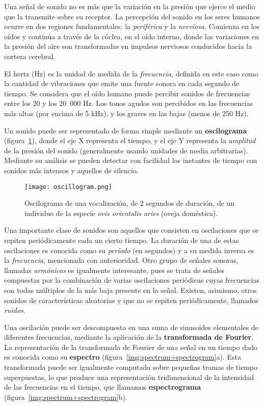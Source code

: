 Una señal de sonido no es más que la variación en la presión que ejerce el medio que la transmite sobre su receptor.
La percepción del sonido en los seres humanos ocurre en dos regiones fundamentales: la \textit{periférica} y la \textit{nerviosa}.
Comienza en los oídos y continúa a través de la cóclea, en el oído interno, donde las variaciones en la presión del aire son transformadas en impulsos nerviosos conducidos hacia la corteza cerebral.

El hertz (Hz) es la unidad de medida de la \textit{frecuencia}, definida en este caso como la cantidad de vibraciones que emite una fuente sonora en cada segundo de tiempo.
Se considera que el oído humano puede percibir sonidos de frecuencias entre los 20 y los 20~000 Hz.
Los tonos agudos son percibidos en las frecuencias más altas (por encima de 5 kHz), y los graves en las bajas (menos de 250 Hz).

Un sonido puede ser representado de forma simple mediante un \textbf{oscilograma} (figura~\ref{img:oscillogram}), donde el eje X representa el tiempo, y el eje Y representa la \textit{amplitud} de la presión del sonido (generalmente usando unidades de media arbitrarias).
Mediante su análisis se pueden detectar con facilidad los instantes de tiempo con sonidos más intensos y aquellos de silencio.

\begin{figure}[!h]
    \centering
    \texttt{[image: oscillogram.png]}
    \caption{Oscilograma de una vocalización, de 2 segundos de duración, de un individuo de la especie \textit{ovis orientalis aries} (oveja doméstica).}
    \label{img:oscillogram}
\end{figure}

Una importante clase de sonidos son aquellos que consisten en oscilaciones que se repiten periódicamente cada un cierto tiempo.
La duración de una de estas oscilaciones es conocida como su \textit{período} (en segundos) y a su medida inversa es la \textit{frecuencia}, mencionada con anterioridad.
Otro grupo de señales sonoras, llamadas \textit{armónicas} es igualmente interesante, pues se trata de señales compuestas por la combinación de varias oscilaciones periódicas cuyas frecuencias son todas múltiplos de la más baja presente en la señal.
Existen, asimismo, otros sonidos de características aleatorias y que no se repiten periódicamente, llamados \textit{ruidos}.

Una oscilación puede ser descompuesta en una suma de sinusoides elementales de diferentes frecuencias, mediante la aplicación de la \textbf{transformada de Fourier}.
La representación de la transformada de Fourier de una señal en un tiempo dado es conocida como su \textbf{espectro} (figura~\ref{img:spectrum+spectrogram}a).
Esta transformada puede ser igualmente computada sobre pequeñas tramas de tiempo superpuestas, lo que produce una representación tridimensional de la intensidad de las frecuencias en el tiempo, que llamamos \textbf{espectrograma} (figura~\ref{img:spectrum+spectrogram}b).

